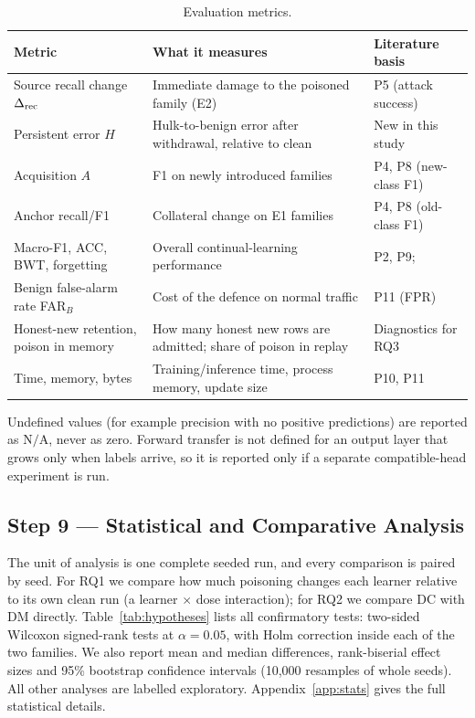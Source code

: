 \documentclass[10pt,a4paper]{article}
\newcommand{\NA}{\mathrm{N/A}}
\begin{document}
\begin{table}[htbp]
\centering\footnotesize
\caption{Evaluation metrics.}
\label{tab:metrics}
\begin{tabularx}{\linewidth}{L{3.6cm}Y L{3.0cm}}
\toprule
Metric & What it measures & Literature basis\\
\midrule
Source recall change $\Delta_{\rm rec}$ & Immediate damage to the poisoned family (E2) & P5 (attack success)\\
Persistent error $H$ & Hulk-to-benign error after withdrawal, relative to clean & New in this study\\
Acquisition $A$ & F1 on newly introduced families & P4, P8 (new-class F1)\\
Anchor recall/F1 & Collateral change on E1 families & P4, P8 (old-class F1)\\
Macro-F1, ACC, BWT, forgetting & Overall continual-learning performance & P2, P9; \cite{gem,clmetrics}\\
Benign false-alarm rate FAR$_B$ & Cost of the defence on normal traffic & P11 (FPR)\\
Honest-new retention, poison in memory & How many honest new rows are admitted; share of poison in replay & Diagnostics for RQ3\\
Time, memory, bytes & Training/inference time, process memory, update size & P10, P11\\
\bottomrule
\end{tabularx}
\end{table}
Undefined values (for example precision with no positive predictions) are reported as $\NA$, never as zero. Forward transfer is not defined for an output layer that grows only when labels arrive, so it is reported only if a separate compatible-head experiment is run.

\subsection{Step 9 --- Statistical and Comparative Analysis}
The unit of analysis is one complete seeded run, and every comparison is paired by seed. For RQ1 we compare how much poisoning changes each learner relative to its own clean run (a learner $\times$ dose interaction); for RQ2 we compare DC with DM directly. Table~\ref{tab:hypotheses} lists all confirmatory tests: two-sided Wilcoxon signed-rank tests \cite{wilcoxon} at $\alpha=0.05$, with Holm correction \cite{holm} inside each of the two families. We also report mean and median differences, rank-biserial effect sizes and 95\% bootstrap confidence intervals (10,000 resamples of whole seeds). All other analyses are labelled exploratory. Appendix~\ref{app:stats} gives the full statistical details.
\end{document}

